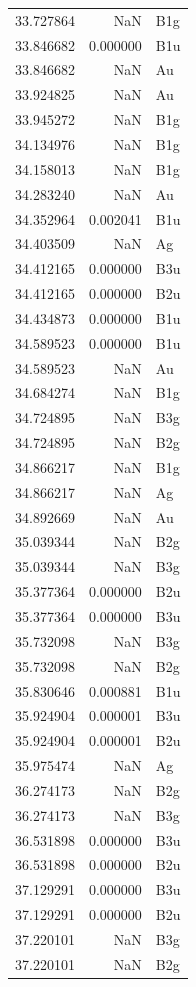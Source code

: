 \begin{longtable}{rrl}
33.727864 & NaN & B1g \\
33.846682 & 0.000000 & B1u \\
33.846682 & NaN & Au \\
33.924825 & NaN & Au \\
33.945272 & NaN & B1g \\
34.134976 & NaN & B1g \\
34.158013 & NaN & B1g \\
34.283240 & NaN & Au \\
34.352964 & 0.002041 & B1u \\
34.403509 & NaN & Ag \\
34.412165 & 0.000000 & B3u \\
34.412165 & 0.000000 & B2u \\
34.434873 & 0.000000 & B1u \\
34.589523 & 0.000000 & B1u \\
34.589523 & NaN & Au \\
34.684274 & NaN & B1g \\
34.724895 & NaN & B3g \\
34.724895 & NaN & B2g \\
34.866217 & NaN & B1g \\
34.866217 & NaN & Ag \\
34.892669 & NaN & Au \\
35.039344 & NaN & B2g \\
35.039344 & NaN & B3g \\
35.377364 & 0.000000 & B2u \\
35.377364 & 0.000000 & B3u \\
35.732098 & NaN & B3g \\
35.732098 & NaN & B2g \\
35.830646 & 0.000881 & B1u \\
35.924904 & 0.000001 & B3u \\
35.924904 & 0.000001 & B2u \\
35.975474 & NaN & Ag \\
36.274173 & NaN & B2g \\
36.274173 & NaN & B3g \\
36.531898 & 0.000000 & B3u \\
36.531898 & 0.000000 & B2u \\
37.129291 & 0.000000 & B3u \\
37.129291 & 0.000000 & B2u \\
37.220101 & NaN & B3g \\
37.220101 & NaN & B2g \\

\end{longtable}
